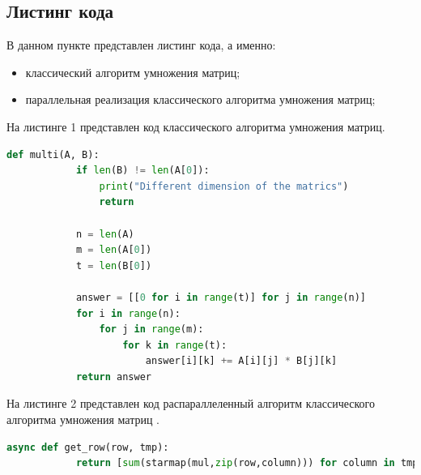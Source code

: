 \documentclass[a4paper, 12pt]{article}
\begin{document}
\begin{flushleft}
	\subsection{Листинг кода}
	В данном пункте представлен листинг кода, а именно:
	\begin{itemize}
		\item классический алгоритм умножения матриц;
		\item параллельная реализация классического алгоритма умножения матриц;
	\end{itemize}


	\lstset{style=mystyle}

	\hspace*{5mm} На листинге 1 представлен код классического алгоритма умножения матриц.
	\begin{lstlisting}[language=Python, caption = Классический алгоритм умножения матриц]
		def multi(A, B):
			if len(B) != len(A[0]):
				print("Different dimension of the matrics")
				return
	
			n = len(A)
			m = len(A[0])
			t = len(B[0])
	
			answer = [[0 for i in range(t)] for j in range(n)]
			for i in range(n):
				for j in range(m):
					for k in range(t):
						answer[i][k] += A[i][j] * B[j][k]
			return answer
	\end{lstlisting}
	\clearpage
	\newpage
	\hspace*{5mm} На листинге 2 представлен код распараллеленный алгоритм классического алгоритма умножения матриц .
	\begin{lstlisting}[language=Python, caption = Параллельный алгоритм умножения матриц]
		async def get_row(row, tmp):
			return [sum(starmap(mul,zip(row,column))) for column in tmp]
			

\end{lstlisting}
\end{flushleft}
\end{document}
